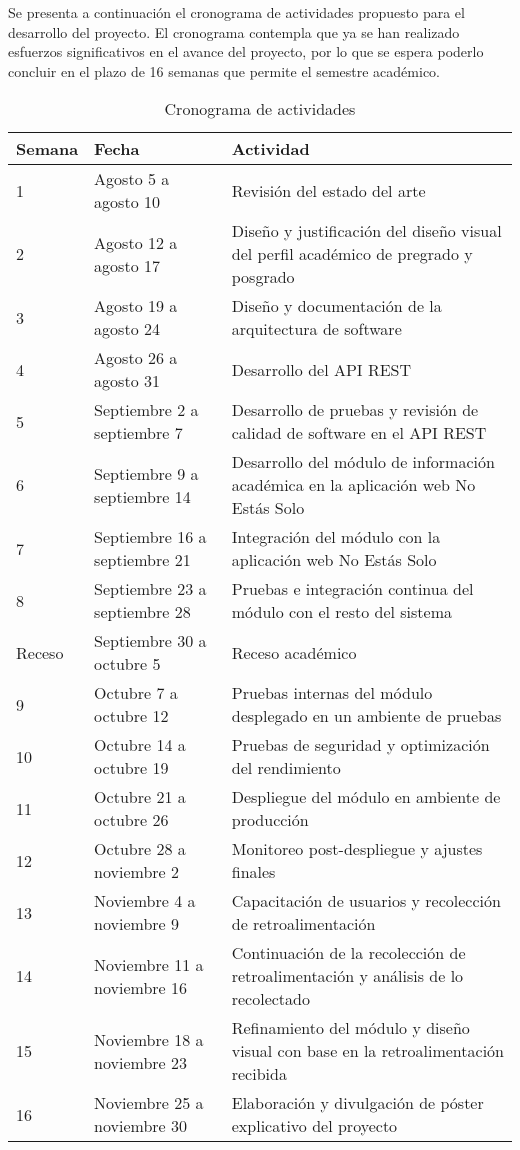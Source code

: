 \documentclass{fmbproyectogrado}
\begin{document}
Se presenta a continuación el cronograma de actividades propuesto para el desarrollo del proyecto. El cronograma contempla que ya se han realizado esfuerzos significativos en el avance del proyecto, por lo que se espera poderlo concluir en el plazo de 16 semanas que permite el semestre académico.
\begin{table}[ht]
  \centering
  \caption{Cronograma de actividades}
  \label{tabla:cronograma}
  \begin{tabular}{p{1.2cm}p{4.3cm}p{8cm}}
  \toprule
  \textbf{Semana} & \textbf{Fecha} & \textbf{Actividad} \\
  \midrule
  1  &  Agosto 5 a agosto 10            & Revisión del estado del arte \\
  2  &  Agosto 12 a agosto 17           & Diseño y justificación del diseño visual del perfil académico de pregrado y posgrado \\
  3  &  Agosto 19 a agosto 24           & Diseño y documentación de la arquitectura de software \\
  4  &  Agosto 26 a agosto 31           & Desarrollo del API REST \\
  5  &  Septiembre 2 a septiembre 7     & Desarrollo de pruebas y revisión de calidad de software en el API REST \\
  6  &  Septiembre 9 a septiembre 14    & Desarrollo del módulo de información académica en la aplicación web No Estás Solo \\
  7  &  Septiembre 16 a septiembre 21   & Integración del módulo con la aplicación web No Estás Solo \\
  8  &  Septiembre 23 a septiembre 28   & Pruebas e integración continua del módulo con el resto del sistema \\
  Receso  &  Septiembre 30 a octubre 5   & Receso académico \\
  9  &  Octubre 7 a octubre 12          & Pruebas internas del módulo desplegado en un ambiente de pruebas \\
  10 &  Octubre 14 a octubre 19         & Pruebas de seguridad y optimización del rendimiento \\
  11 &  Octubre 21 a octubre 26         & Despliegue del módulo en ambiente de producción \\
  12 &  Octubre 28 a noviembre 2        & Monitoreo post-despliegue y ajustes finales \\
  13 &  Noviembre 4 a noviembre 9       & Capacitación de usuarios y recolección de retroalimentación \\
  14 &  Noviembre 11 a noviembre 16     & Continuación de la recolección de retroalimentación y análisis de lo recolectado \\
  15 &  Noviembre 18 a noviembre 23     & Refinamiento del módulo y diseño visual con base en la retroalimentación recibida \\
  16 &  Noviembre 25 a noviembre 30     & Elaboración y divulgación de póster explicativo del proyecto \\
  \bottomrule
  \end{tabular}
  \end{table}
\end{document}
